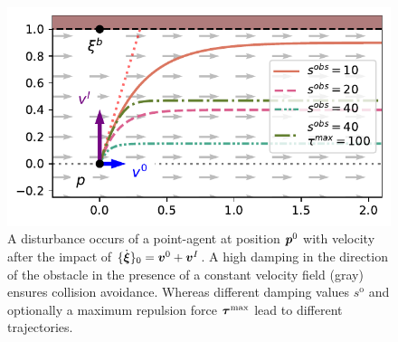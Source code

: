 \begin{figure}[htb]
\centering
  \centerline{\includegraphics[width=0.99\columnwidth]{figures/parallel_avoidance_obstacle}}
  \caption{A disturbance occurs of a point-agent at position $\boldsymbol{p}^0$ with velocity after the impact of $\{ \dot{\boldsymbol{\xi}} \}_0 = \boldsymbol{v}^0 + \boldsymbol{v}^I$. A high damping in the direction of the obstacle in the presence of a constant velocity field (gray) ensures collision avoidance. Whereas different damping values $s^{\mathrm{o}}$ and optionally a maximum repulsion force $\boldsymbol{\tau}^{\mathrm{max}}$ lead to different trajectories.}
  \label{fig:disturbance_with_parallel_velocity}
\end{figure}
    
